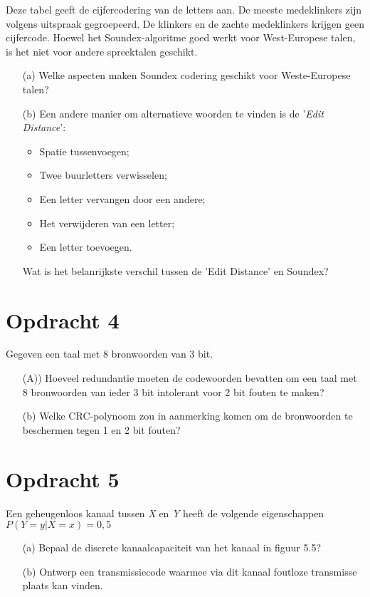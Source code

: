 Deze tabel geeft de cijfercodering van de letters aan. De meeste medeklinkers zijn volgens uitspraak gegroepeerd. De klinkers en de zachte medeklinkers krijgen geen cijfercode. Hoewel het Soundex-algoritme goed werkt voor West-Europese talen, is het niet voor andere spreektalen geschikt.

\begin{itemize}
  \item[(a)] Welke aspecten maken Soundex codering geschikt voor Weste-Europese talen?
  \item[(b)] Een andere manier om alternatieve woorden te vinden is de '\emph{Edit Distance}':
    \begin{itemize}
      \item Spatie tussenvoegen;
      \item Twee buurletters verwisselen;
      \item Een letter vervangen door een andere;
      \item Het verwijderen van een letter;
      \item Een letter toevoegen.
    \end{itemize}
    Wat is het belanrijkste verschil tussen de 'Edit Distance' en Soundex?
\end{itemize}

\section{Opdracht 4}
Gegeven een taal met 8 bronwoorden van 3 bit.
\begin{itemize}
  \item[(A))] Hoeveel redundantie moeten de codewoorden bevatten om een taal met 8 bronwoorden van ieder 3 bit intolerant voor 2 bit fouten te maken?
\item[(b)] Welke CRC-polynoom zou in aanmerking komen om de bronwoorden te beschermen tegen 1 en 2 bit fouten?
\end{itemize}

\section{Opdracht 5}
Een geheugenloos kanaal tussen \emph{X} en \emph{Y} heeft de volgende eigenschappen $P(Y=y|X=x)=0,5$
\begin{itemize}
  \item[(a)] Bepaal de discrete kanaalcapaciteit van het kanaal in figuur 5.5?
  \item[(b)] Ontwerp een transmissiecode waarmee via dit kanaal foutloze transmisse plaats kan vinden.
\end{itemize}


